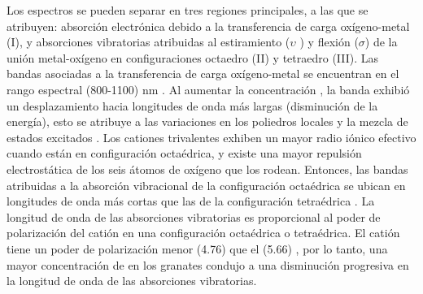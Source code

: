 Los espectros se pueden separar en tres regiones principales, a las que se
atribuyen: absorción electrónica debido a la transferencia de carga
oxígeno-metal (I), y absorciones vibratorias atribuidas al estiramiento ($\upsilon$ ) y
flexión ($\sigma$) de la unión metal-oxígeno en configuraciones octaedro (II) y
tetraedro (III). Las bandas asociadas a la transferencia de carga oxígeno-metal
se encuentran en el rango espectral (800-1100) nm \cite{Rossman2019}. Al aumentar la concentración
, la banda exhibió un desplazamiento hacia longitudes de onda más largas
(disminución de la energía), esto se atribuye a las variaciones en los
poliedros locales y la mezcla de estados excitados \cite{Krambrock2013}. Los cationes trivalentes
exhiben un mayor radio iónico efectivo cuando
están en configuración octaédrica, y existe una mayor repulsión electrostática
de los seis átomos de oxígeno que los rodean. Entonces, las bandas atribuidas a
la absorción vibracional de la configuración octaédrica se ubican en longitudes
de onda más cortas que las de la configuración tetraédrica \cite{Rossman2019}. La longitud de
onda de las absorciones vibratorias es proporcional al poder de polarización
del catión en una configuración octaédrica o tetraédrica. El catión  tiene
un poder de polarización menor (4.76) que el  (5.66) \cite{Bishop2019}, por lo tanto, una
mayor concentración de  en los granates condujo a una disminución
progresiva en la longitud de onda de las absorciones vibratorias.